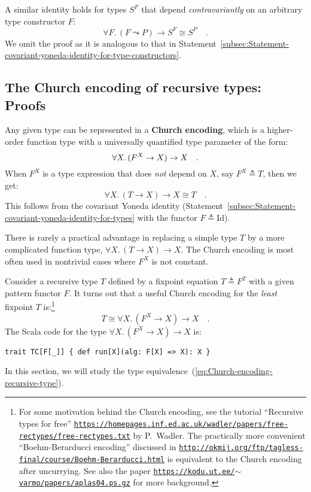 A similar identity holds for types $S^{F}$ that depend \emph{contravariantly}
on an arbitrary type constructor $F$:
\begin{equation}
\forall F.\,(F\leadsto P)\rightarrow S^{F}\cong S^{P}\quad.\label{eq:contravariant-yoneda-identity-for-type-constructors}
\end{equation}
We omit the proof as it is analogous to that in Statement~\ref{subsec:Statement-covariant-yoneda-identity-for-type-constructors}.

\subsection{The Church encoding of recursive types: Proofs\label{subsec:The-Church-encoding-of-recursive-types}}

Any given type can be represented in a \textbf{Church encoding},
which is a higher-order function type with a universally quantified
type parameter of the form:
\[
\text{\ensuremath{\forall X.\,(F^{X}\rightarrow X)\rightarrow X\quad.}}
\]
When $F^{X}$ is a type expression that does \emph{not} depend on
$X$, say $F^{X}\triangleq T$, then we get:
\[
\forall X.\,\left(T\rightarrow X\right)\rightarrow X\cong T\quad.
\]
This follows from the covariant Yoneda identity (Statement~\ref{subsec:Statement-covariant-yoneda-identity-for-types}
with the functor $F\triangleq\text{Id}$). 

There is rarely a practical advantage in replacing a simple type $T$
by a more complicated function type, $\forall X.\,(T\rightarrow X)\rightarrow X$.
The Church encoding is most often used in nontrivial cases where $F^{X}$
is not constant.

Consider a recursive type $T$ defined by a fixpoint equation $T\triangleq F^{T}$
with a given pattern functor $F$. It turns out that a useful Church
encoding for the \emph{least} fixpoint $T$ is:\footnote{For some motivation behind the Church encoding, see the tutorial \textsf{``}Recursive
types for free\textsf{''} \texttt{\href{https://homepages.inf.ed.ac.uk/wadler/papers/free-rectypes/free-rectypes.txt}{https://homepages.inf.ed.ac.uk/wadler/papers/free-rectypes/free-rectypes.txt}}
by P.~Wadler. The practically more convenient
\textsf{``}Boehm-Berarducci encoding\textsf{''}
discussed in \texttt{\href{http://okmij.org/ftp/tagless-final/course/Boehm-Berarducci.html}{http://okmij.org/ftp/tagless-final/course/Boehm-Berarducci.html}}
is equivalent to the Church encoding after uncurrying. See also the
paper \texttt{\href{https://kodu.ut.ee/~varmo/papers/aplas04.ps.gz}{https://kodu.ut.ee/$\sim$varmo/papers/aplas04.ps.gz}}
for more background.}
\begin{equation}
T\cong\forall X.\,(F^{X}\rightarrow X)\rightarrow X\quad.\label{eq:Church-encoding-recursive-type}
\end{equation}
The Scala code for the type $\forall X.\,(F^{X}\rightarrow X)\rightarrow X$
is:
\begin{lstlisting}
trait TC[F[_]] { def run[X](alg: F[X] => X): X }
\end{lstlisting}
In this section, we will study the type equivalence~(\ref{eq:Church-encoding-recursive-type}).

